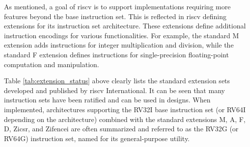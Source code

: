 As mentioned, a goal of \acrshort{riscv} is to support implementations requiring more features beyond the base instruction set. This is reflected in \acrshort{riscv} defining extensions \cite{riscv:manual:user:2024} for its instruction set architecture. These extensions define additional instruction encodings for various functionalities. For example, the standard M extension adds instructions for integer multiplication and division, while the standard F extension defines instructions for single-precision floating-point computation and manipulation.

\begin{table}[h!]
    \centering
    \caption{Development status of extended RISC-V instruction sets. \cite{riscv:manual:user:2024}}
    \label{tab:extension_status}
\end{table}

Table \ref{tab:extension_status} above clearly lists the standard extension sets developed and published by \acrshort{riscv} International. It can be seen that many instruction sets have been ratified and can be used in designs. When implemented, architectures supporting the RV32I base instruction set (or RV64I depending on the architecture) combined with the standard extensions M, A, F, D, Zicsr, and Zifencei are often summarized and referred to as the RV32G (or RV64G) instruction set, named for its general-purpose utility.

